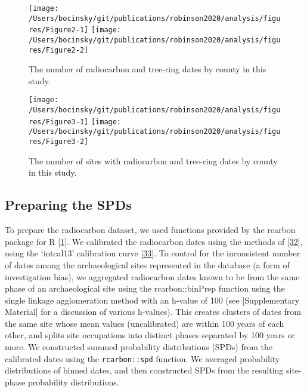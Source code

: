 \documentclass[
]{sa}
\begin{document}
\begin{figure}

{\centering \texttt{[image: /Users/bocinsky/git/publications/robinson2020/analysis/figures/Figure2-1]} \texttt{[image: /Users/bocinsky/git/publications/robinson2020/analysis/figures/Figure2-2]} 

}

\caption{The number of radiocarbon and tree-ring dates by county in this study.}\label{fig:Figure2}
\end{figure}

\begin{figure}

{\centering \texttt{[image: /Users/bocinsky/git/publications/robinson2020/analysis/figures/Figure3-1]} \texttt{[image: /Users/bocinsky/git/publications/robinson2020/analysis/figures/Figure3-2]} 

}

\caption{The number of sites with radiocarbon and tree-ring dates by county in this study.}\label{fig:Figure3}
\end{figure}

\hypertarget{preparing-the-spds}{%
\subsection*{Preparing the SPDs}\label{preparing-the-spds}}

To prepare the radiocarbon dataset, we used functions provided by the rcarbon package for R {[}\protect\hyperlink{ref-Bevan2019}{1}{]}. We calibrated the radiocarbon dates using the methods of {[}\protect\hyperlink{ref-Bronk2008}{32}{]}, using the `intcal13' calibration curve {[}\protect\hyperlink{ref-Reimer2013}{33}{]}. To control for the inconsistent number of dates among the archaeological sites represented in the database (a form of investigation bias), we aggregated radiocarbon dates known to be from the same phase of an archaeological site using the rcarbon::binPrep function using the single linkage agglomeration method with an h-value of 100 (see {[}Supplementary Material{]} for a discussion of various h-values). This creates clusters of dates from the same site whose mean values (uncalibrated) are within 100 years of each other, and splits site occupations into distinct phases separated by 100 years or more. We constructed summed probability distributions (SPDs) from the calibrated dates using the \texttt{rcarbon::spd} function. We averaged probability distributions of binned dates, and then constructed SPDs from the resulting site-phase probability distributions.
\end{document}
